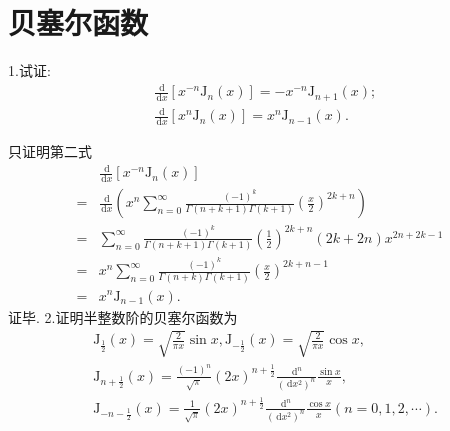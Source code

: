 \documentclass[titlepage,11pt,a4paper,twoside]{report}
\makeatletter
\newcommand\diff{\,\mathrm{d}}
\newcommand\rmJ{\mathrm{J}}
\renewenvironment{proof}{\par
	\pushQED{\qed}%
	\normalfont \topsep1\p@\@plus6\p@\relax
	\trivlist
	\item\relax
	{\hspace*{\parindent}{\heiti 证明}\@addpunct{:}}\hspace\labelsep\ignorespaces
}{%
	\popQED\endtrivlist\@endpefalse
}
\makeatother
\begin{document}
\section{贝塞尔函数}
1.试证:\[\begin{split}&\frac{\diff}{\diff x}\left[x^{-n}\mathrm{J}_n(x)\right]=-x^{-n}\mathrm{J}_{n+1}(x);\\
&\frac{\diff}{\diff x}\left[x^n\mathrm{J}_n(x)\right]=x^n\mathrm{J}_{n-1}(x).\end{split}\]
\begin{proof}只证明第二式
\[\begin{split}
&\frac{\diff}{\diff x}\left[x^{-n}\mathrm{J}_n(x)\right]\\
=&\frac{\diff}{\diff x}\left(x^n\sum_{n=0}^{\infty}\frac{(-1)^k}{\Gamma(n+k+1)\Gamma(k+1)}\left(\frac{x}{2}\right)^{2k+n}\right)\\
=&\sum_{n=0}^{\infty}\frac{(-1)^k}{\Gamma(n+k+1)\Gamma(k+1)}\left(\frac{1}{2}\right)^{2k+n}(2k+2n)x^{2n+2k-1}\\
=&x^n\sum_{n=0}^{\infty}\frac{(-1)^k}{\Gamma(n+k)\Gamma(k+1)}\left(\frac{x}{2}\right)^{2k+n-1}\\
=&x^n\mathrm{J}_{n-1}(x).
\end{split}\]
证毕.
\end{proof}
2.证明半整数阶的贝塞尔函数为
\[\begin{split}
&\rmJ_{\frac{1}{2}}(x)=\sqrt{\frac{2}{\pi x}}\sin x,\rmJ_{-\frac{1}{2}}(x)=\sqrt{\frac{2}{\pi x}}\cos x,\\
&\rmJ_{n+\frac{1}{2}}(x)=\frac{(-1)^n}{\sqrt{\pi}}(2x)^{n+\frac{1}{2}}\frac{\diff^n}{(\diff x^2)^n}\frac{\sin x}{x},\\
&\rmJ_{-n-\frac{1}{2}}(x)=\frac{1}{\sqrt{\pi}}(2x)^{n+\frac{1}{2}}\frac{\diff^n}{(\diff x^2)^n}\frac{\cos x}{x}(n=0,1,2,\cdots).
\end{split}\]
\end{document}
